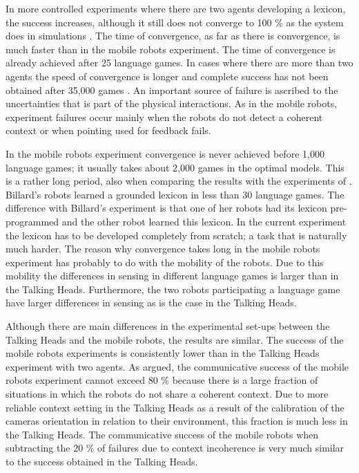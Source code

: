 In more controlled experiments where there are two agents developing a lexicon, the success increases, although it still does not converge to 100 \% as the system does in simulations \citep{steels:2000}. The time of convergence, as far as there is convergence, is much faster than in the mobile robots experiment. The time of convergence is already achieved after 25 language games. In cases where there are more than two agents the speed of convergence is longer and complete success has not been obtained after 35,000 games \citep{steels:2000}.  An important source of failure is ascribed to the uncertainties that is part of the physical interactions. As in the mobile robots, experiment failures occur mainly when the robots do not detect a coherent context or when pointing used for feedback fails.

In the mobile robots experiment convergence is never achieved before 1,000 language games; it usually takes about 2,000 games in the optimal models. This is a rather long period, also when comparing the results with the experiments of \citet{billard:1999}. Billard's robots learned a grounded lexicon in less than 30 language games. The difference with Billard's experiment is that one of her robots had its lexicon pre-programmed and the other robot learned this lexicon. In the current experiment the lexicon has to be developed completely from scratch; a task that is naturally much harder. The reason why convergence takes long in the mobile robots experiment has probably to do with the mobility of the robots. Due to this mobility the differences in sensing in different language games is larger than in the Talking Heads. Furthermore, the two robots participating a language game have larger differences in sensing as is the case in the Talking Heads.


Although there are main differences in the experimental set-ups between the Talking Heads and the mobile robots, the results are similar. The success of the mobile robots experiments is consistently lower than in the Talking Heads experiment with two agents. As argued, the communicative success of the mobile robots experiment cannot exceed 80 \% because there is a large fraction of situations in which the robots do not share a coherent context. Due to more reliable context setting in the Talking Heads as a result of the calibration of the cameras orientation in relation to their environment, this fraction is much less in the Talking Heads. The communicative success of the mobile robots when subtracting the 20 \% of failures due to context incoherence is very much similar to the success obtained in the Talking Heads. 


